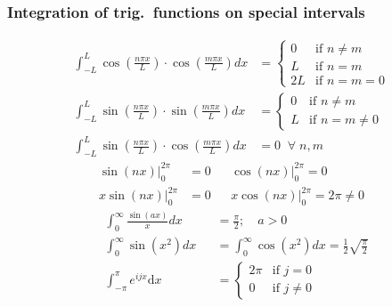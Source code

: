 \subsubsection{Integration of trig.\ functions on special intervals}
\begin{align*}
    \int_{-L}^L \cos\left(\frac{n\pi x}{L}\right)\cdot \cos\left(\frac{m\pi x}{L}\right) dx & =\begin{cases}
                                                                                                   0  & \text{if } n\neq m \\
                                                                                                   L  & \text{if } n=m     \\
                                                                                                   2L & \text{if } n=m=0
                                                                                               \end{cases}   \\
    \int_{-L}^L \sin\left(\frac{n\pi x}{L}\right)\cdot \sin\left(\frac{m\pi x}{L}\right) dx & =\begin{cases}
                                                                                                   0 & \text{if }n\neq m     \\
                                                                                                   L & \text{if } n=m\neq 0
                                                                                               \end{cases} \\
    \int_{-L}^L \sin\left(\frac{n\pi x}{L}\right)\cdot \cos\left(\frac{m\pi x}{L}\right) dx & =0\;\;\forall\; n,m
\end{align*}
\begin{align*}
    \sin(nx)\Big|_0^{2\pi}  & =0 &  & \cos(nx)\Big|_0^{2\pi}=0           \\
    x\sin(nx)\Big|_0^{2\pi} & =0 &  & x\cos(nx)\Big|_0^{2\pi}=2\pi\neq0
\end{align*}
\begin{align*}
     & \int_0^{\infty} \frac{\sin(ax)}{x} dx &  & =\frac{\pi}{2};\quad a>0                                                 \\
     & \int_0^{\infty} \sin(x^2) dx          &  & =\int_0^{\infty}\cos(x^2)dx=\frac{1}{2}\sqrt{\frac{\pi}{2}}              \\
     & \int_{-\pi}^{\pi} e^{ijx} \text{d}x   &  & = \begin{cases}2\pi & \text{if } j=0\\ 0 & \text{if } j\neq 0\end{cases}
\end{align*}


